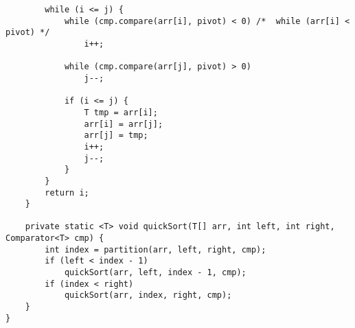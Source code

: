 \begin{lstlisting}
        while (i <= j) {
            while (cmp.compare(arr[i], pivot) < 0) /*  while (arr[i] < pivot) */
                i++;

            while (cmp.compare(arr[j], pivot) > 0)
                j--;

            if (i <= j) {
                T tmp = arr[i];
                arr[i] = arr[j];
                arr[j] = tmp;
                i++;
                j--;
            }
        }
        return i;
    }

    private static <T> void quickSort(T[] arr, int left, int right, Comparator<T> cmp) {
        int index = partition(arr, left, right, cmp);
        if (left < index - 1)
            quickSort(arr, left, index - 1, cmp);
        if (index < right)
            quickSort(arr, index, right, cmp);
    }
}
\end{lstlisting}